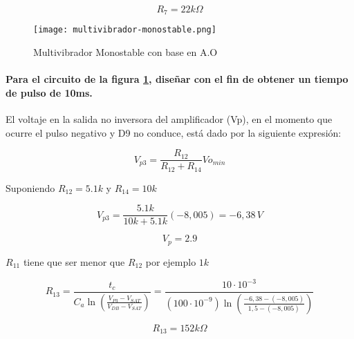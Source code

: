 $$R_7 = 22k\Omega$$


\begin{figure}[ht]
    \centering
    \texttt{[image: multivibrador-monostable.png]}
    \caption{Multivibrador Monostable con base en A.O}
    \label{fig:multivibrador-monostable}
\end{figure}


\paragraph{Para el circuito de la figura \ref{fig:multivibrador-monostable}, diseñar con el fin de obtener un tiempo de pulso de 10ms. }

El voltaje en la salida no inversora del amplificador (Vp), en el momento que ocurre el pulso negativo y D9 no conduce, está dado por la siguiente expresión: 

\[
V_{p3} = \frac{R_{12}}{R_{12} + R_{14}} Vo_{min}
\]

Suponiendo $R_{12} = 5.1k$ y $R_14 = 10k$

\[
V_{p3} = \frac{5.1k}{10k + 5.1k} (-8,005) = -6,38\,V
\]

$$V_p = 2.9$$

$R_{11}$ tiene que ser menor que $R_{12}$ por ejemplo $1k$

\[
R_{13} = \frac{t_c}{C_a \ln \left( \frac{V_{P3} - V_{SAT}}{V_{DB} - V_{SAT}} \right)} = \frac{10 \cdot 10^{-3}}{(100 \cdot 10^{-9}) \ln \left( \frac{-6,38 - (-8,005)}{1,5 - (-8,005)} \right)}
\]

$$R_{13} = 152k\Omega$$